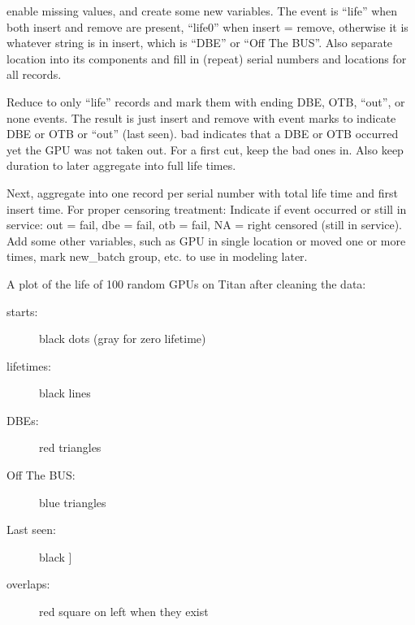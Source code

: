  enable missing values, and create some new
variables. The event is “life” when both insert and remove are
present, “life0” when insert = remove, otherwise it is whatever string
is in insert, which is “DBE” or “Off The BUS”. Also separate location
into its components and fill in (repeat) serial numbers and locations
for all records.

Reduce to only “life” records and mark them with ending DBE, OTB,
“out”, or none events. The result is just insert and remove with event
marks to indicate DBE or OTB or “out” (last seen). bad indicates that
a DBE or OTB occurred yet the GPU was not taken out. For a first cut,
keep the bad ones in. Also keep duration to later aggregate into full
life times.

Next, aggregate into one record per serial number with total life time
and first insert time. For proper censoring treatment: Indicate if
event occurred or still in service: out = fail, dbe = fail, otb =
fail, NA = right censored (still in service). Add some other
variables, such as GPU in single location or moved one or more times,
mark new\_batch group, etc. to use in modeling later.

A plot of the life of 100 random GPUs on Titan after cleaning the data:
\begin{description}
\item[starts:] black dots (gray for zero lifetime)
\item[lifetimes:] black lines
\item[DBEs:] red triangles
\item[Off The BUS:] blue triangles
\item[Last seen:] black ]
\item[overlaps:] red square on left when they exist
\end{description}

